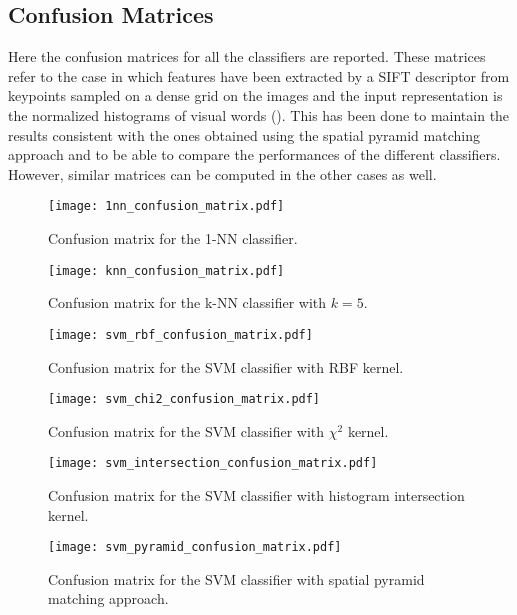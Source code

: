 \documentclass[../main.tex]{subfiles}
\begin{document}
\pagebreak
\subsection{Confusion Matrices}\label{app:confusion-matrices}

Here the confusion matrices for all the classifiers are reported. These matrices
refer to the case in which features have been extracted by a SIFT descriptor
from keypoints sampled on a dense grid on the images and the input
representation is the normalized histograms of visual words (). This has been done to maintain the results consistent with the ones obtained using the spatial pyramid matching approach and to be able to compare the performances of the different classifiers. However, similar matrices can be computed in the other cases as well.\\

\begin{figure}[htb]
  \centering
  \texttt{[image: 1nn\_confusion\_matrix.pdf]}
  \caption{Confusion matrix for the 1-NN classifier.}\label{fig:confusion-matrix-1nn}
\end{figure}

\begin{figure}[htb]
  \centering
  \texttt{[image: knn\_confusion\_matrix.pdf]}
  \caption{Confusion matrix for the k-NN classifier with $k = 5$.}\label{fig:confusion-matrix-knn}
\end{figure}

\begin{figure}[htb]
  \centering
  \texttt{[image: svm\_rbf\_confusion\_matrix.pdf]}
  \caption{Confusion matrix for the SVM classifier with RBF kernel.}\label{fig:confusion-matrix-rbf}
\end{figure}

\begin{figure}[htb]
  \centering
  \texttt{[image: svm\_chi2\_confusion\_matrix.pdf]}
  \caption{Confusion matrix for the SVM classifier with $\chi^2$ kernel.}\label{fig:confusion-matrix-chi2}
\end{figure}

\begin{figure}[htb]
  \centering
  \texttt{[image: svm\_intersection\_confusion\_matrix.pdf]}
  \caption{Confusion matrix for the SVM classifier with histogram intersection kernel.}\label{fig:confusion-matrix-intersection}
\end{figure}

\begin{figure}[htb]
  \centering
  \texttt{[image: svm\_pyramid\_confusion\_matrix.pdf]}
  \caption{Confusion matrix for the SVM classifier with spatial pyramid matching
  approach.}\label{fig:confusion-matrix-pmk}
\end{figure}
\end{document}
